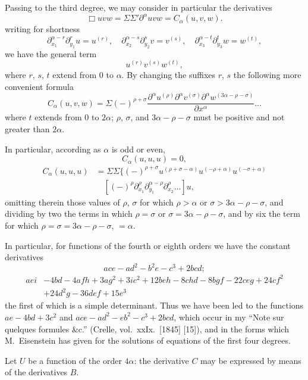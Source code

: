 \documentclass[11pt,a4paper]{article}
\theoremstyle{plain}
\theoremstyle{definition}
\theoremstyle{remark}
\begin{document}
\newpage
Passing to the third degree, we may consider in particular the derivatives
\[
\Box uvw = \Sigma \Sigma' \partial^{\alpha} uvw = C_{\alpha}(u, v, w).
\]
writing for shortness
\[
\partial_{x_1}^{\alpha - r} \partial_{y_1}^r u = u^{(r)}, \quad
\partial_{x_2}^{\alpha - s} \partial_{y_2}^s v = v^{(s)}, \quad
\partial_{x_3}^{\alpha - t} \partial_{y_3}^t w = w^{(t)},
\]
we have the general term
\[
u^{(r)} v^{(s)} w^{(t)},
\]
where $r$, $s$, $t$ extend from $0$ to $\alpha$. By changing the suffixes $r$, $s$ the following more
convenient formula
\[
C_{\alpha}(u, v, w) = \Sigma (-)^{\rho + \sigma} \frac{\partial^{\alpha} u^{(\rho)} \partial^{\alpha} v^{(\sigma)} \partial^{\alpha} w^{(3\alpha - \rho - \sigma)}}{\partial x^{\alpha}} \ldots
\]
where $t$ extends from $0$ to $2\alpha$; $\rho$, $\sigma$, and $3\alpha - \rho - \sigma$ must be positive and not greater
than $2\alpha$.

In particular, according as $\alpha$ is odd or even,
\[
C_{\alpha}(u, u, u) = 0,
\]
\begin{align*}
C_{\alpha}(u, u, u) &= \Sigma \Sigma \{(-)^{\rho + \sigma} u^{(\rho + \sigma - \alpha)} u^{(-\rho + \alpha)} u^{(-\sigma + \alpha)} \\
&\quad [(-)^{\rho} \partial_{x_1}^{\rho} \partial_{y_1}^{\alpha - \rho} \partial_{x_2}^{\rho} \ldots] u,
\end{align*}
omitting therein those values of $\rho$, $\sigma$ for which $\rho > \alpha$ or $\sigma > 3\alpha - \rho - \sigma$, and dividing by
two the terms in which $\rho = \sigma$ or $\sigma = 3\alpha - \rho - \sigma$, and by six the term for which
$\rho = \sigma = 3\alpha - \rho - \sigma$, $= \alpha$.

In particular, for functions of the fourth or eighth orders we have the constant
derivatives
\[
ace - ad^2 - b^2e - c^3 + 2bcd;
\]
\begin{align*}
aei &- 4bd - 4afh + 3ag^2 + 3ic^2 + 12beh - 8chd - 8bgf - 22ceg + 24cf^2 \\
&+ 24d^2g - 36def + 15e^3
\end{align*}
the first of which is a simple determinant. Thus we have been led to the functions
$ae - 4bd + 3c^2$ and $ace - ad^2 - eb^2 - c^3 + 2bcd$, which occur in my ``Note sur quelques
formules \&c.'' (Crelle, vol.~xxIx.\ [1845] [15]), and in the forms which M.~Eisenstein has
given for the solutions of equations of the first four degrees.

Let $U$ be a function of the order $4\alpha$: the derivative $C$ may be expressed by
means of the derivatives $B$.
\end{document}
